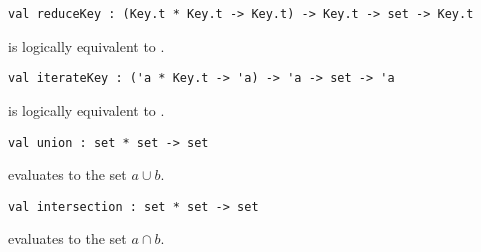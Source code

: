 \begin{cluster}
\label{grp:grm:ordset-interface::reducekey}

\begin{gram}[reduceKey]
\label{grm:ordset-interface::reducekey}
\begin{verbatim}
val reduceKey : (Key.t * Key.t -> Key.t) -> Key.t -> set -> Key.t
\end{verbatim}
 is logically equivalent to .

\end{gram}
\end{cluster}

\begin{cluster}
\label{grp:grm:ordset-interface::iteratekey}

\begin{gram}[iterateKey]
\label{grm:ordset-interface::iteratekey}
\begin{verbatim}
val iterateKey : ('a * Key.t -> 'a) -> 'a -> set -> 'a
\end{verbatim}
 is logically equivalent to .

\end{gram}
\end{cluster}

\begin{cluster}
\label{grp:grm:ordset-interface::union}

\begin{gram}[union]
\label{grm:ordset-interface::union}
\begin{verbatim}
val union : set * set -> set
\end{verbatim}
 evaluates to the set $a \cup b$.

\end{gram}
\end{cluster}

\begin{cluster}
\label{grp:grm:ordset-interface::intersection}

\begin{gram}[intersection]
\label{grm:ordset-interface::intersection}
\begin{verbatim}
val intersection : set * set -> set
\end{verbatim}
 evaluates to the set $a \cap b$.

\end{gram}
\end{cluster}

